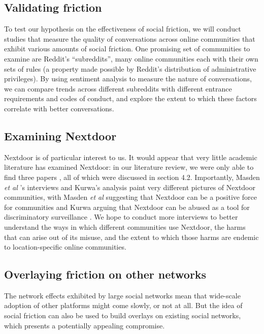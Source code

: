 \documentclass[sigconf,authordraft]{acmart}
\newcommand{\etal}{{\itshape et al }}
\begin{document}
\subsection{Validating friction}

To test our hypothesis on the effectiveness of social friction, we will conduct studies that measure the quality of conversations across online communities that exhibit various amounts of social friction. One promising set of communities to examine are Reddit's ``subreddits'', many online communities each with their own sets of rules (a property made possible by Reddit's distribution of administrative privileges). By using sentiment analysis to measure the nature of conversations, we can compare trends across different subreddits with different entrance requirements and codes of conduct, and explore the extent to which these factors correlate with better conversations.

\subsection{Examining Nextdoor}

Nextdoor is of particular interest to us. It would appear that very little academic literature has examined Nextdoor: in our literature review, we were only able to find three papers \cite{masden2014tensions, kurwa2019building, payne2017welcome}, all of which were discussed in section 4.2. Importantly, Masden \etal's interviews and Kurwa's analysis paint very different pictures of Nextdoor communities, with Masden \etal suggesting that Nextdoor can be a positive force for communities \cite{masden2014tensions} and Kurwa arguing that Nextdoor can be abused as a tool for discriminatory surveillance \cite{kurwa2019building}. We hope to conduct more interviews to better understand the ways in which different communities use Nextdoor, the harms that can arise out of its misuse, and the extent to which those harms are endemic to location-specific online communities.

\subsection{Overlaying friction on other networks}

The network effects \cite{katz1994systems} exhibited by large social networks mean that wide-scale adoption of other platforms might come slowly, or not at all. But the idea of social friction can also be used to build overlays on existing social networks, which presents a potentially appealing compromise.  
\end{document}
